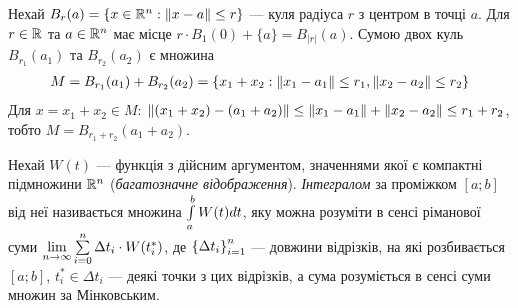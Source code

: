 \begin{example}
    Нехай $B_{r}(a) = \left\{x \in \mathbb{R}^n : \left\Vert x - a \right\Vert \leq r \right\}$ --- куля
    радіуса $r$ з центром в точці $a$. Для
    $r \in \mathbb{R}$ та $a \in \mathbb{R}^n$ має місце
    $r\cdot B_{1}(0) + \{a\} = B_{|r|}(a)$.
    Сумою двох куль $B_{r_1}(a_1)$ та $B_{r_2}(a_2)$ є множина
    \begin{gather*}
        M = B_{r_1}(a_1) + B_{r_2}(a_2) = \left\{ 
            x_1 + x_2 : \left\Vert x_1 - a_1 \right\Vert \leq r_1, \left\Vert x_2 - a_2 \right\Vert \leq r_2    
        \right\}
    \end{gather*}
    Для $x = x_1 + x_2 \in M$: $\left\Vert (x_1 + x_2) - (a_1 + a_2) \right\Vert \leq \left\Vert x_1 - a_1 \right\Vert + \left\Vert x_2 - a_2 \right\Vert \leq r_1 + r_2$,
    тобто $M = B_{r_1 + r_2}(a_1 + a_2)$.
    \begin{center}
    \end{center}
    
\end{example}
\begin{definition}
    Нехай $W(t)$ --- функція з дійсним аргументом, значеннями якої
    є компактні підмножини $\mathbb{R}^n$ (\emph{багатозначне відображення}).
    \emph{Інтегралом} за проміжком $[a;b]$ від неї називається множина
    $\int\limits_a^b W(t) dt$, яку можна розуміти в сенсі ріманової суми
    $\underset{n\to\infty}{\lim} \sum\limits_{i=0}^n \Delta t_i\cdot W(t_i^*)$,
    де $\left\{\Delta t_i\right\}_{i=1}^n$ --- довжини відрізків, на які розбивається $[a;b]$, $t_i^* \in \Delta t_i$ ---
    деякі точки з цих відрізків, а сума розуміється в сенсі суми множин за Мінковським.
\end{definition}

